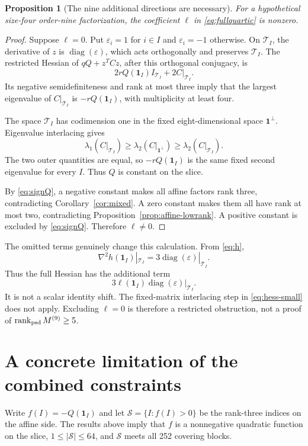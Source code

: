 \documentclass[11pt]{article}
\newtheorem{proposition}[theorem]{Proposition}
\theoremstyle{remark}\newtheorem{remark}[theorem]{Remark}
\newcommand{\psdrank}{\operatorname{rank}_{\rm psd}}
\newcommand{\diag}{\operatorname{diag}}
\newcommand{\one}{\mathbf 1}
\begin{document}
\begin{proposition}[The nine additional directions are necessary]\label{prop:ell}
For a hypothetical size-four order-nine factorization, the coefficient $\ell$ in \eqref{eq:fullquartic} is nonzero.
\end{proposition}
\begin{proof}
Suppose $\ell=0$. Put $\varepsilon_i=1$ for $i\in I$ and $\varepsilon_i=-1$ otherwise. On $\mathcal T_I$, the derivative of $z$ is $\diag(\varepsilon)$, which acts orthogonally and preserves $\mathcal T_I$. The restricted Hessian of $qQ+z^TCz$, after this orthogonal conjugacy, is
\begin{equation}\label{eq:hess-small}
 2rQ(\one_I)I_{\mathcal T_I}+2C|_{\mathcal T_I}.
\end{equation}
Its negative semidefiniteness and rank at most three imply that the largest eigenvalue of $C|_{\mathcal T_I}$ is $-rQ(\one_I)$, with multiplicity at least four.

The space $\mathcal T_I$ has codimension one in the fixed eight-dimensional space $\one^\perp$. Eigenvalue interlacing gives
\[
 \lambda_1(C|_{\mathcal T_I})\geq
 \lambda_2(C|_{\one^\perp})\geq
 \lambda_2(C|_{\mathcal T_I}).
\]
The two outer quantities are equal, so $-rQ(\one_I)$ is the same fixed second eigenvalue for every $I$. Thus $Q$ is constant on the slice.

By \eqref{eq:signQ}, a negative constant makes all affine factors rank three, contradicting Corollary~\ref{cor:mixed}. A zero constant makes them all have rank at most two, contradicting Proposition~\ref{prop:affine-lowrank}. A positive constant is excluded by \eqref{eq:signQ}. Therefore $\ell\ne0$.
\end{proof}

The omitted terms genuinely change this calculation. From \eqref{eq:h},
\[
 \nabla^2h(\one_I)|_{\mathcal T_I}
 =3\diag(\varepsilon)|_{\mathcal T_I}.
\]
Thus the full Hessian has the additional term
\[
 3\ell(\one_I)\diag(\varepsilon)|_{\mathcal T_I}.
\]
It is not a scalar identity shift. The fixed-matrix interlacing step in \eqref{eq:hess-small} does not apply. Excluding $\ell=0$ is therefore a restricted obstruction, not a proof of $\psdrank M^{(9)}\geq5$.

\section{A concrete limitation of the combined constraints}
Write $f(I)=-Q(\one_I)$ and let $\mathcal S=\{I:f(I)>0\}$ be the rank-three indices on the affine side. The results above imply that $f$ is a nonnegative quadratic function on the slice, $1\leq|\mathcal S|\leq64$, and $\mathcal S$ meets all 252 covering blocks.
\end{document}
